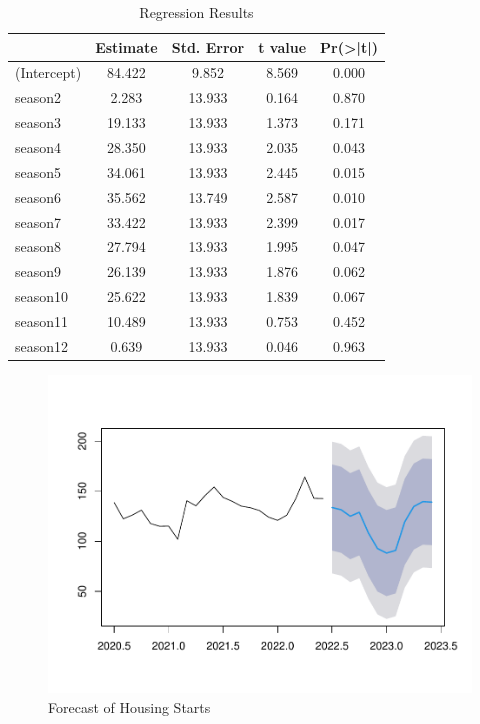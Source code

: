\documentclass[]{book}
\theoremstyle{definition}
\theoremstyle{definition}
\theoremstyle{definition}
\theoremstyle{remark}
\begin{document}
\begin{table}

\caption{\label{tab:ch5-table3}Regression Results}
\centering
\begin{tabular}[t]{lcccc}
\toprule
  & Estimate & Std. Error & t value & Pr(>|t|)\\
\midrule
(Intercept) & 84.422 & 9.852 & 8.569 & 0.000\\
season2 & 2.283 & 13.933 & 0.164 & 0.870\\
season3 & 19.133 & 13.933 & 1.373 & 0.171\\
season4 & 28.350 & 13.933 & 2.035 & 0.043\\
season5 & 34.061 & 13.933 & 2.445 & 0.015\\
\addlinespace
season6 & 35.562 & 13.749 & 2.587 & 0.010\\
season7 & 33.422 & 13.933 & 2.399 & 0.017\\
season8 & 27.794 & 13.933 & 1.995 & 0.047\\
season9 & 26.139 & 13.933 & 1.876 & 0.062\\
season10 & 25.622 & 13.933 & 1.839 & 0.067\\
\addlinespace
season11 & 10.489 & 13.933 & 0.753 & 0.452\\
season12 & 0.639 & 13.933 & 0.046 & 0.963\\
\bottomrule
\end{tabular}
\end{table}

\begin{figure}

{\centering \includegraphics[width=0.8\linewidth]{bookdown-demo_files/figure-latex/ch5-figure5-1} 

}

\caption{Forecast of Housing Starts}\label{fig:ch5-figure5}
\end{figure}
\end{document}

